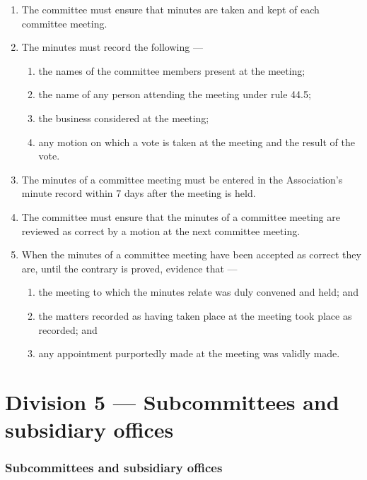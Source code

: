 \begin{enumerate}

\item The committee must ensure that minutes are taken and kept of each committee meeting.
\item The minutes must record the following ---

  \begin{enumerate}
  
  \item the names of the committee members present at the meeting;
  \item the name of any person attending the meeting under rule 44.5;
  \item the business considered at the meeting;
  \item any motion on which a vote is taken at the meeting and the result of the vote.
  \end{enumerate}
\item The minutes of a committee meeting must be entered in the Association's minute record within 7 days after the meeting is held.
\item The committee must ensure that the minutes of a committee meeting are reviewed as correct by a motion at the next committee meeting.
\item When the minutes of a committee meeting have been accepted as correct they are, until the contrary is proved, evidence that ---

  \begin{enumerate}
  
  \item the meeting to which the minutes relate was duly convened and held; and
  \item the matters recorded as having taken place at the meeting took place as recorded; and
  \item any appointment purportedly made at the meeting was validly made.
  \end{enumerate}
\end{enumerate}

\hypertarget{division-5-subcommittees-and-subsidiary-offices}{%
\part*{Division 5 --- Subcommittees and subsidiary offices}\label{division-5-subcommittees-and-subsidiary-offices}}

\hypertarget{subcommittees-and-subsidiary-offices}{%
\section{Subcommittees and subsidiary offices}\label{subcommittees-and-subsidiary-offices}}


